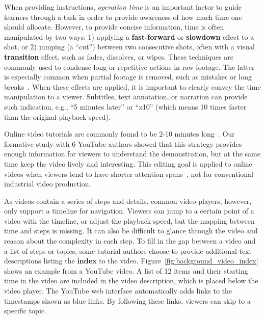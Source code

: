 When providing instructions, \emph{operation time} is an important factor to guide learners through a task in order to provide awareness of how much time one should allocate.
%
However, to provide concise information, time is often manipulated by two ways: 1) applying a \textbf{fast-forward} or \textbf{slowdown} effect to a shot, or 2) jumping (a ``cut'') between two consecutive shots, often with a visual \textbf{transition} effect, such as fades, dissolves, or wipes. These techniques are commonly used to condense long or repetitive actions in raw footage. The latter is especially common when partial footage is removed, such as mistakes or long breaks~\cite{Tseng:2014:PVP:2598510.2598540}.
%
When these effects are applied, it is important to clearly convey the time manipulation to a viewer. Subtitles, text annotation, or narration can provide such indication, e.g., ``5 minutes later'' or ``x10'' (which means 10 times faster than the original playback speed).




Online video tutorials are commonly found to be 2-10 minutes long~\cite{Chi:2013:DGC:2501988.2502052}. Our formative study with 6 YouTube authors showed that this strategy provides enough information for viewers to understand the demonstration, but at the same time keep the video lively and interesting. This editing goal is applied to online videos when viewers tend to have shorter attention spans~\cite{YouTubeVideoLength2016,YouTubeVideoLength2012}, not for conventional industrial video production.

As videos contain a series of steps and details, common video players, however, only support a timeline for navigation. Viewers can jump to a certain point of a video with the timeline, or adjust the playback speed, but the mapping between time and steps is missing. It can also be difficult to glance through the video and reason about the complexity in each step.
%
To fill in the gap between a video and a list of steps or topics, some tutorial authors choose to provide additional text descriptions listing the \textbf{index} to the video. Figure~\ref{fig:background_video_index} shows an example from a YouTube video. A list of 12 items and their starting time in the video are included in the video description, which is placed below the video player. The YouTube web interface automatically adds links to the timestamps shown as blue links. By following these links, viewers can skip to a specific topic.

